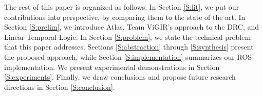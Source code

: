 The rest of this paper is organized as follows.
In Section \ref{S:lit}, we put our contributions into perspective, by comparing them to the state of the art.
In Section \ref{S:prelim}, we introduce Atlas, Team ViGIR's approach to the DRC, and Linear Temporal Logic.
In Section \ref{S:problem}, we state the technical problem that this paper addresses.
Sections \ref{S:abstraction} through \ref{S:synthesis} present the proposed approach, while Section \ref{S:implementation} summarizes our ROS implementation.
We present experimental demonstrations in Section \ref{S:experiments}.
Finally, we draw conclusions and propose future research directions in Section \ref{S:conclusion}.

